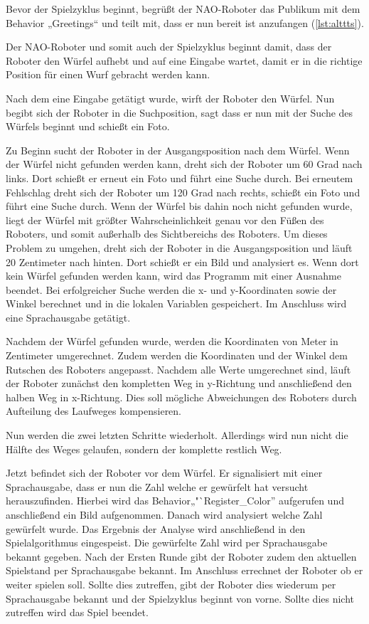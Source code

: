     Bevor der Spielzyklus beginnt, begrüßt der NAO-Roboter das Publikum mit
    dem Behavior „Greetings“ und teilt mit, dass er nun bereit ist
    anzufangen (\autoref{lst:alttts}).

    Der NAO-Roboter und somit auch der Spielzyklus beginnt damit, dass der
    Roboter den Würfel aufhebt und auf eine Eingabe wartet, damit er
    in die richtige Position für einen Wurf gebracht werden kann.

    Nach dem eine Eingabe getätigt wurde, wirft der Roboter den Würfel.
    Nun begibt sich der Roboter in die Suchposition, sagt dass
    er nun mit der Suche des Würfels beginnt und schießt ein Foto.

    Zu Beginn sucht der Roboter in der Ausgangsposition nach dem Würfel.
    Wenn der Würfel nicht gefunden werden kann, dreht sich der Roboter um
    60 Grad nach links.
    Dort schießt er erneut ein Foto und führt eine Suche durch.
    Bei erneutem Fehlschlag dreht sich der Roboter um 120 Grad nach rechts,
    schießt ein Foto und führt eine Suche durch.
    Wenn der Würfel bis dahin noch nicht gefunden wurde, liegt der Würfel
    mit größter Wahrscheinlichkeit genau vor den Füßen des Roboters, und somit
    außerhalb des Sichtbereichs des Roboters.
    Um dieses Problem zu umgehen, dreht sich der Roboter in die
    Ausgangsposition und läuft 20 Zentimeter nach hinten.
    Dort schießt er ein Bild und analysiert es.
    Wenn dort kein Würfel gefunden werden kann, wird das Programm
    mit einer Ausnahme beendet.
    Bei erfolgreicher Suche werden die x- und y-Koordinaten sowie der Winkel
    berechnet und in die lokalen Variablen gespeichert.
    Im Anschluss wird eine Sprachausgabe getätigt.

    Nachdem der Würfel gefunden wurde, werden die Koordinaten von
    Meter in Zentimeter umgerechnet.
    Zudem werden die Koordinaten und der Winkel dem Rutschen des Roboters
    angepasst.
    Nachdem alle Werte umgerechnet sind, läuft der
    Roboter zunächst den kompletten Weg in y-Richtung und anschließend den
    halben Weg in x-Richtung.
    Dies soll mögliche Abweichungen des Roboters durch Aufteilung des Laufweges
    kompensieren.

    Nun werden die zwei letzten Schritte wiederholt.
    Allerdings wird nun nicht die Hälfte des Weges gelaufen, sondern der
    komplette restlich Weg.

    Jetzt befindet sich der Roboter vor dem Würfel.
    Er signalisiert mit einer Sprachausgabe, dass er nun die Zahl welche er
    gewürfelt hat versucht herauszufinden.
    Hierbei wird das Behavior„"`Register\_Color'' aufgerufen und
    anschließend ein Bild aufgenommen.
    Danach wird analysiert welche Zahl gewürfelt wurde.
    Das Ergebnis der Analyse wird anschließend in den Spielalgorithmus
    eingespeist.
    Die gewürfelte Zahl wird per Sprachausgabe bekannt gegeben.
    Nach der Ersten Runde gibt der Roboter zudem den aktuellen Spielstand per
    Sprachausgabe bekannt.
    Im Anschluss errechnet der Roboter ob er weiter spielen soll.
    Sollte dies zutreffen, gibt der Roboter dies wiederum per Sprachausgabe
    bekannt und der Spielzyklus beginnt von vorne.
    Sollte dies nicht zutreffen wird das Spiel beendet.

